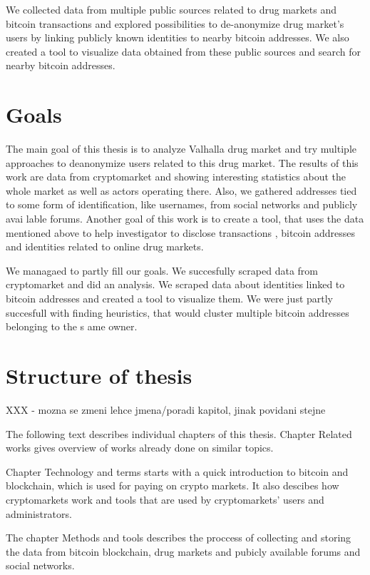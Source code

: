 \documentclass[
  digital, %
  table,   %
  lof,     %
  lot,     %
  oneside
]{fithesis3}
\begin{document}
We collected data from multiple public sources related to drug markets and bitcoin transactions and explored
 possibilities to de-anonymize drug market's users by linking publicly known identities to nearby bitcoin addresses.
We also created a tool to visualize data obtained from these public sources and search for nearby bitcoin addresses.

\section{Goals}

The main goal of this thesis is to analyze Valhalla drug market
and try multiple approaches to deanonymize users related to this drug market.
The results of this work are data from cryptomarket and
 showing interesting statistics about the whole market as well as actors operating there.
 Also, we gathered addresses tied to some form of identification, like usernames, from social networks and publicly avai
lable forums.
Another goal of this work is to create a tool, that uses the data mentioned above to help investigator to disclose transactions
, bitcoin addresses and identities related to online drug markets.

We managaed to partly fill our goals. We succesfully scraped data from cryptomarket and did an analysis.
We scraped data about identities linked to bitcoin addresses and created a tool to visualize them.
We were just partly succesfull with finding heuristics, that would cluster multiple bitcoin addresses belonging to the s
ame owner.

\section{Structure of thesis}
XXX - mozna se zmeni lehce jmena/poradi kapitol, jinak povidani stejne

The following text describes individual chapters of this thesis.
Chapter Related works gives overview of works already done on similar topics. 

Chapter Technology and terms starts with a quick introduction to bitcoin and blockchain,
which is used for paying on crypto markets.
It also descibes how cryptomarkets work and tools that are used by cryptomarkets' users and administrators.

The chapter Methods and tools describes the proccess of collecting and storing the data from bitcoin blockchain,
drug markets and pubicly available forums and social networks. 
\end{document}
